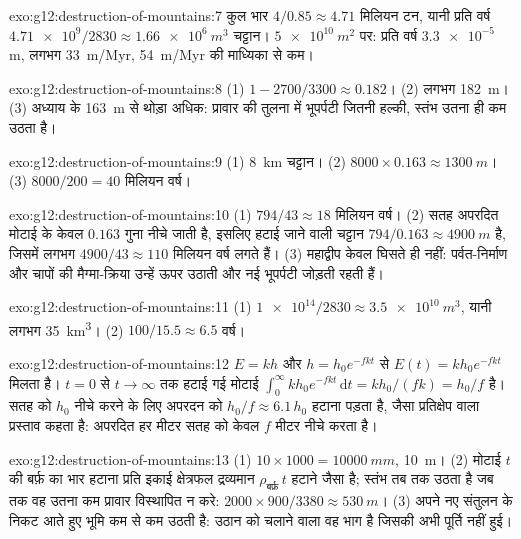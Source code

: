 \begin{solution}{exo:g12:destruction-of-mountains:7}
कुल भार $4/0.85 \approx 4.71$ मिलियन टन, यानी प्रति वर्ष $\num{4.71e9}/2830 \approx
\qty{1.66e6}{m^3}$ चट्टान। $\qty{5e10}{m^2}$ पर: प्रति वर्ष $\num{3.3e-5}$ m,
लगभग \qty{33}{m/Myr}, \qty{54}{m/Myr} की माध्यिका से कम।
\end{solution}

\begin{solution}{exo:g12:destruction-of-mountains:8}
(1) $1 - 2700/3300 \approx 0.182$। (2) लगभग \qty{182}{m}। (3) अध्याय के
\qty{163}{m} से थोड़ा अधिक: प्रावार की तुलना में भूपर्पटी जितनी हल्की,
स्तंभ उतना ही कम उठता है।
\end{solution}

\begin{solution}{exo:g12:destruction-of-mountains:9}
(1) \qty{8}{km} चट्टान। (2) $8000 \times 0.163 \approx \qty{1300}{m}$।
(3) $8000/200 = 40$ मिलियन वर्ष।
\end{solution}

\begin{solution}{exo:g12:destruction-of-mountains:10}
(1) $794/43 \approx 18$ मिलियन वर्ष। (2) सतह अपरदित मोटाई के केवल
$0.163$ गुना नीचे जाती है, इसलिए हटाई जाने वाली चट्टान $794/0.163
\approx \qty{4900}{m}$ है, जिसमें लगभग $4900/43 \approx 110$ मिलियन वर्ष लगते हैं।
(3) महाद्वीप केवल घिसते ही नहीं: पर्वत-निर्माण और
चापों की मैग्मा-क्रिया उन्हें ऊपर उठाती और नई भूपर्पटी जोड़ती रहती हैं।
\end{solution}

\begin{solution}{exo:g12:destruction-of-mountains:11}
(1) $\num{1e14}/2830 \approx \qty{3.5e10}{m^3}$, यानी लगभग
\qty{35}{km^3}। (2) $100/15.5 \approx 6.5$ वर्ष।
\end{solution}

\begin{solution}{exo:g12:destruction-of-mountains:12}
$E = kh$ और $h = h_0 e^{-fkt}$ से $E(t) = kh_0 e^{-fkt}$ मिलता है।
$t = 0$ से $t \to \infty$ तक हटाई गई मोटाई $\int_0^{\infty} kh_0
e^{-fkt}\,\mathrm{d}t = kh_0/(fk) = h_0/f$ है। सतह को $h_0$ नीचे करने के लिए
अपरदन को $h_0/f \approx 6.1\,h_0$ हटाना पड़ता है, जैसा प्रतिक्षेप वाला प्रस्ताव
कहता है: अपरदित हर मीटर सतह को केवल $f$ मीटर नीचे करता है।
\end{solution}

\begin{solution}{exo:g12:destruction-of-mountains:13}
(1) $10 \times 1000 = \qty{10000}{mm}$, \qty{10}{m}। (2) मोटाई $t$ की बर्फ़ का भार हटाना
प्रति इकाई क्षेत्रफल द्रव्यमान $\rho_{\text{बर्फ़}}\,t$ हटाने जैसा है;
स्तंभ तब तक उठता है जब तक वह उतना कम प्रावार विस्थापित न करे:
$2000 \times 900/3380 \approx \qty{530}{m}$। (3) अपने नए संतुलन के निकट आते हुए भूमि
कम से कम उठती है: उठान को चलाने वाला वह भाग है जिसकी
अभी पूर्ति नहीं हुई।
\end{solution}

